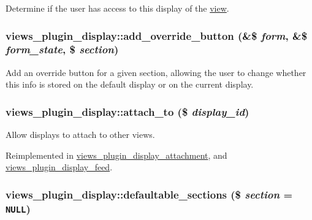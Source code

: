 Determine if the user has access to this display of the \hyperlink{classview}{view}. \hypertarget{classviews__plugin__display_60dd36bfcf55cb6248f572688c2474b8}{
\subsubsection[{add\_\-override\_\-button}]{\setlength{\rightskip}{0pt plus 5cm}views\_\-plugin\_\-display::add\_\-override\_\-button (\&\$ {\em form}, \/  \&\$ {\em form\_\-state}, \/  \$ {\em section})}}
\label{classviews__plugin__display_60dd36bfcf55cb6248f572688c2474b8}


Add an override button for a given section, allowing the user to change whether this info is stored on the default display or on the current display. \hypertarget{classviews__plugin__display_a74683048bca4e740cb7e25ae4c527d4}{
\subsubsection[{attach\_\-to}]{\setlength{\rightskip}{0pt plus 5cm}views\_\-plugin\_\-display::attach\_\-to (\$ {\em display\_\-id})}}
\label{classviews__plugin__display_a74683048bca4e740cb7e25ae4c527d4}


Allow displays to attach to other views. 

Reimplemented in \hyperlink{classviews__plugin__display__attachment_e8fcfc681cc9ff841ac5c0bdf1691b31}{views\_\-plugin\_\-display\_\-attachment}, and \hyperlink{classviews__plugin__display__feed_ea8b688de38f11854afdb4194e87f59d}{views\_\-plugin\_\-display\_\-feed}.\hypertarget{classviews__plugin__display_1ff9cd1b5762dde8765e608efdec8ec4}{
\subsubsection[{defaultable\_\-sections}]{\setlength{\rightskip}{0pt plus 5cm}views\_\-plugin\_\-display::defaultable\_\-sections (\$ {\em section} = {\tt NULL})}}
\label{classviews__plugin__display_1ff9cd1b5762dde8765e608efdec8ec4}


